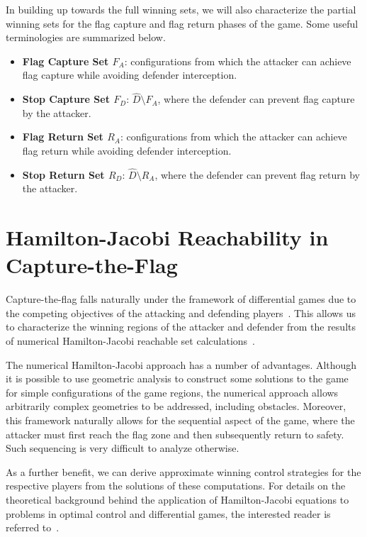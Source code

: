 \documentclass[letterpaper, 10 pt, conference]{ieeeconf}  %
\numberwithin{algorithm}{section}
\begin{document}
In building up towards the full winning sets, we will also characterize the partial winning sets for the flag capture and flag return phases of the game. Some useful terminologies are summarized below.
\begin{itemize}
\item{{\bf Flag Capture Set $F_A$}: configurations from which the attacker can achieve flag capture while avoiding defender interception.}
\item{ {\bf Stop Capture Set $F_D$}: $\hat{D} \setminus F_A$, where the defender can prevent flag capture by the attacker.}
\item{ {\bf Flag Return Set $R_A$}: configurations from which the attacker can achieve flag return while avoiding defender interception.} 
\item{ {\bf Stop Return Set $R_D$}: $\hat{D} \setminus R_A$, where the defender can prevent flag return by the attacker.}
\end{itemize}

\section{Hamilton-Jacobi Reachability in Capture-the-Flag}
\label{sec:hj_formulation}
Capture-the-flag falls naturally under the framework of differential games due to the competing objectives of the attacking and defending players~\cite{b:basar-olsder-1999}. This allows us to characterize the winning regions of the attacker and defender from the results of numerical Hamilton-Jacobi reachable set calculations~\cite{j:mitchell-TAC-2005,mitchell-thesis}.

The numerical Hamilton-Jacobi approach has a number of advantages. Although it is possible to use geometric analysis to construct some solutions to the game for simple configurations of the game regions, the numerical approach allows arbitrarily complex geometries to be addressed, including obstacles. Moreover, this framework naturally allows for the sequential aspect of the game, where the attacker must first reach the flag zone and then subsequently return to safety. Such sequencing is very difficult to analyze otherwise.  

As a further benefit, we can derive approximate winning control strategies for the respective players from the solutions of these computations. For details on the theoretical background behind the application of Hamilton-Jacobi equations to problems in optimal control and differential games, the interested reader is referred to~\cite{b:bardi-1997}. 
\end{document}
